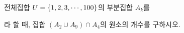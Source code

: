 전체집합 $U=\{1{,}\mkern3mu\mathopen{}2{,}\mkern3mu\mathopen{}3{,}\mkern3mu\mathopen{}\cdots{,}\mkern3mu\mathopen{}100\}$의 부분집합 $A_k$를\par\smallskip{}\par\smallskip\noindent 라 할 때, 집합 $(A_2\cup A_9)\cap A_4$의 원소의 개수를 구하시오.
